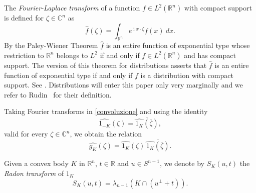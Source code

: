 \documentclass[a4paper]{amsart}
\theoremstyle{definition}
\numberwithin{equation}{section}
\begin{document}
The \emph{Fourier-Laplace transform} of a function $f\in L^2({\mathbb{R}}^n)$ with compact support is defined for $\zeta\in{\mathbb{C}}^n$ as
\[
{\widehat{{{f}}}}(\zeta)=\int_{{\mathbb{R}}^n}e^{{\operatorname{i}} x\cdot \zeta}f(x)\ dx.
\]
By the Paley-Wiener Theorem ${\widehat{{{f}}}}$ is an entire function of exponential type whose restriction to ${\mathbb{R}}^n$ belongs to $L^2$ if and only if $f\in L^2({\mathbb{R}}^n)$ and has compact support. The version of this theorem for distributions asserts that ${\widehat{{{f}}}}$ is an entire function of exponential type  if and only if $f$ is a distribution with compact support. See \cite[Theorem~7.23]{Rudin-91}.   Distributions will enter this paper only very marginally and we refer to Rudin~\cite{Rudin-91} for their definition.

Taking Fourier transforms in \eqref{convoluzione} and using the identity
\begin{equation}\label{riflessione_in_Cn}
{\widehat{{{1_{-K}}}}}(\zeta)={\overline{{{\widehat{{{1_{K}}}}}\left({\overline{\zeta}}\right)}}},
\end{equation}
valid for every ${{\zeta}}\in{\mathbb{C}}^n$, we obtain the relation
\begin{equation}\label{convoluzione_in_cn}
{\widehat{{{g_K}}}}(\zeta)
={\widehat{{{1_K}}}}(\zeta)\,{\overline{{{\widehat{{{1_{K}}}}}\left({\overline{\zeta}}\right)}}}.
\end{equation}

Given a convex body $K$ in ${\mathbb{R}}^n$, $t\in{\mathbb{R}}$ and $u\in {S^{n-1}}$,  we denote by $S_K(u,t)$ the \emph{Radon transform} of $1_K$
\begin{equation*}
S_K(u,t)={{\lambda}}_{n-1}\left(K\cap(u^\perp+t)\right).
\end{equation*}
\end{document}
